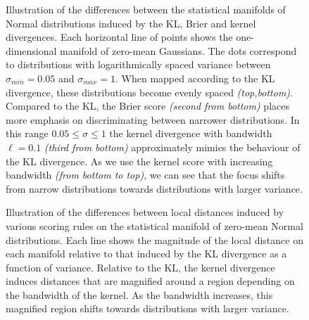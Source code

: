 \begin{figure} %
	\begin{center}
	\end{center}
	\caption[Brier, kernel and logarithmic scoring of Normal distributions]{Illustration of the differences between the statistical manifolds of Normal distributions induced by the KL, Brier and kernel divergences. Each horizontal line of points shows the one-dimensional manifold of zero-mean Gaussians. The dots correspond to distributions with logarithmically spaced variance between $\sigma_{min}=0.05$ and $\sigma_{max}=1$. When mapped according to the KL divergence, these distributions become evenly spaced \emph{(top,bottom)}. Compared to the KL, the Brier score \emph{(second from bottom)} places more emphasis on discriminating between narrower distributions. In this range $0.05 \leq \sigma \leq 1$ the kernel divergence with bandwidth $\ell=0.1$ \emph{(third from bottom)} approximately mimics the behaviour of the KL divergence. As we use the kernel score with increasing bandwidth \emph{(from bottom to top)}, we can see that the focus shifts from narrow distributions towards distributions with larger variance.\label{fig:Normal_varonly_comparison}}
\end{figure}

\begin{figure}[t] %
	\begin{center}
	\end{center}
	\caption[Local distances on the statistical manifold of Normal distributions]{Illustration of the differences between local distances induced by various scoring rules on the statistical manifold of zero-mean Normal distributions. Each line shows the magnitude of the local distance on each manifold relative to that induced by the KL divergence as a function of variance. Relative to the KL, the kernel divergence induces distances that are magnified around a region depending on the bandwidth of the kernel. As the bandwidth increases, this magnified region shifts towards distributions with larger variance.	\label{fig:Normal_varonly_magnification}}
\end{figure}

